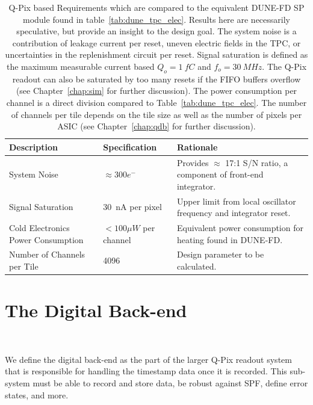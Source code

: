 \begin{table}
\begin{center}
\begin{tabular}{|| p{40mm} | p{40mm} | p{70mm} ||}
 \hline
 Description & Specification & Rationale \\ [0.5ex]
 \hline\hline
  System Noise & $\approx 300 e^{-}$ & Provides $\approx$ 17:1 S/N ratio, a component of front-end integrator. \\
 \hline
  Signal Saturation & 30~\unit{nA} per pixel & Upper limit from local oscillator frequency and integrator reset. \\
 \hline
  Cold Electronics Power Consumption & $< 100 \unit{\mu W}$ per channel & Equivalent power consumption for heating found in DUNE-FD. \\
 \hline
  Number of Channels per Tile & 4096 & Design parameter to be calculated. \\
 \hline
\end{tabular}
\caption{Q-Pix based Requirements which are compared to the equivalent DUNE-FD SP module found in table~\ref{tab:dune_tpc_elec}.
Results here are necessarily speculative, but provide an insight to the design goal.
The system noise is a contribution of leakage current per reset, uneven electric fields in the TPC, or uncertainties in the replenishment circuit per reset.
Signal saturation is defined as the maximum measurable current based $Q_{o} = 1~\unit{fC}$ and $f_{o} = 30~\unit{MHz}$.
The Q-Pix readout can also be saturated by too many resets if the FIFO buffers overflow (see Chapter~\ref{chap:sim} for further discussion).
The power consumption per channel is a direct division compared to Table~\ref{tab:dune_tpc_elec}.
The number of channels per tile depends on the tile size as well as the number of pixels per ASIC (see Chapter~\ref{chap:qdb} for further discussion).
}
\label{tab:qpix_tpc_elec}
\end{center}
\end{table}

\section{The Digital Back-end}~\label{sec:digital_back-end}

We define the digital back-end as the part of the larger Q-Pix readout system that is responsible for handling the timestamp data once it is recorded.
This sub-system must be able to record and store data, be robust against SPF, define error states, and more.

